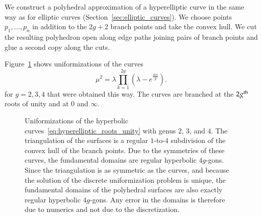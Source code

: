 \documentclass[Thesis]{subfiles}
\begin{document}
We construct a polyhedral approximation of a hyperelliptic curve in
the same way as for elliptic curves
(Section~\ref{sec:elliptic_curves}). We choose points
$p_{1},\ldots,p_{n}$ in addition to the $2g+2$ branch points and take
the convex hull. We cut the resulting polyhedron open along edge paths
joining pairs of branch points and glue a second copy along the cuts.

Figure~\ref{fig:roots_of_unity_curve} shows uniformizations of the curves
\begin{equation}
  \label{eq:hyperelliptic_roots_unity}
  \mu^2=\lambda\prod_{k=1}^{2g}\left(\lambda-e^{\frac{ik\pi}{g}}\right).
\end{equation}
for $g=2,3,4$ that were obtained this way. The curves
are branched at the $2g^{\rm th}$ roots of unity and at $0$ and $\infty$.

\begin{figure} 
\centering
{}
\caption{ Uniformizations of the hyperbolic
  curves~\eqref{eq:hyperelliptic_roots_unity} with genus $2$, $3$, and
  $4$. The triangulation of the surfaces is a regular $1$-to-$4$
  subdivision of the convex hull of the branch points. Due to the
  symmetries of these curves, the fundamental domains are regular
  hyperbolic $4g$-gons. Since the triangulation is as symmetric as the
  curves, and because the solution of the discrete uniformization
  problem is unique, the fundamental domains of the polyhedral
  surfaces are also exactly regular hyperbolic $4g$-gons. Any
  error in the domains is therefore due to numerics and not due to the discretization.}
\label{fig:roots_of_unity_curve} 
\end{figure}
\end{document}

